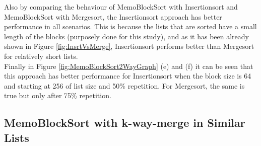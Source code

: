 \documentclass[a4paper,12pt]{article}
\begin{document}
Also by comparing the behaviour of MemoBlockSort with Insertionsort and MemoBlockSort with Mergesort, the Insertionsort approach has better performance in all scenarios. This is because the lists that are sorted have a small length of the blocks (purposely done for this study), and as it has been already shown in Figure \ref{fig:InsrtVsMerge}, Insertionsort performs better than Mergesort for relatively short lists.\\


Finally in Figure \ref{fig:MemoBlockSort2WayGraph} (e) and (f)  it can be seen that this approach has better performance for Insertionsort when the block size is 64 and starting at 256 of list size and 50\% repetition. For Mergesort, the same is true but only after 75\% repetition.

\subsection{MemoBlockSort with k-way-merge in Similar Lists}
\end{document}
